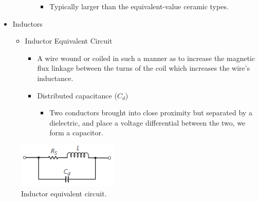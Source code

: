 \begin{itemize}
\begin{itemize}
\begin{itemize}
\begin{itemize}
				\item Typically larger than	the equivalent-value ceramic types.
			\end{itemize}
		\end{itemize}
	\end{itemize}
	\item Inductors
	\begin{itemize}
		\item Inductor Equivalent Circuit
		\begin{itemize}
			\item A wire wound or coiled in	such a manner as to increase the magnetic flux linkage between the turns of the coil which increases the wire's inductance.
			\item Distributed capacitance ($C_d$) 
			\begin{itemize}
				\item Two conductors brought into close proximity but separated by a dielectric, and place a voltage differential between the two, we form a	capacitor.
			\end{itemize}
		\end{itemize}
	\end{itemize}
\end{itemize}

\begin{figure} [H]
	\centering
	\includegraphics[width=0.4\linewidth]{graphics/18.png}
	\caption{Inductor equivalent circuit.}
	\label{fig:18}
\end{figure}

